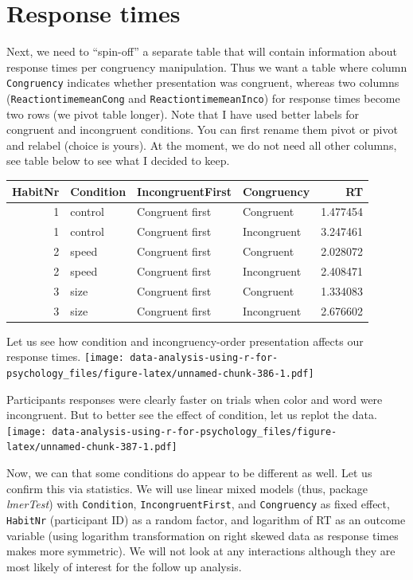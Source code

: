 \documentclass[
]{book}
\begin{document}
\hypertarget{response-times}{%
\section{Response times}\label{response-times}}

Next, we need to ``spin-off'' a separate table that will contain information about response times per congruency manipulation. Thus we want a table where column \texttt{Congruency} indicates whether presentation was congruent, whereas two columns (\texttt{ReactiontimemeanCong} and \texttt{ReactiontimemeanInco}) for response times become two rows (we pivot table longer). Note that I have used better labels for congruent and incongruent conditions. You can first rename them pivot or pivot and relabel (choice is yours). At the moment, we do not need all other columns, see table below to see what I decided to keep.

\begin{tabular}{r|l|l|l|r}
\hline
HabitNr & Condition & IncongruentFirst & Congruency & RT\\
\hline
1 & control & Congruent first & Congruent & 1.477454\\
\hline
1 & control & Congruent first & Incongruent & 3.247461\\
\hline
2 & speed & Congruent first & Congruent & 2.028072\\
\hline
2 & speed & Congruent first & Incongruent & 2.408471\\
\hline
3 & size & Congruent first & Congruent & 1.334083\\
\hline
3 & size & Congruent first & Incongruent & 2.676602\\
\hline
\end{tabular}

Let us see how condition and incongruency-order presentation affects our response times.
\texttt{[image: data-analysis-using-r-for-psychology\_files/figure-latex/unnamed-chunk-386-1.pdf]}

Participants responses were clearly faster on trials when color and word were incongruent. But to better see the effect of condition, let us replot the data.
\texttt{[image: data-analysis-using-r-for-psychology\_files/figure-latex/unnamed-chunk-387-1.pdf]}

Now, we can that some conditions do appear to be different as well. Let us confirm this via statistics. We will use linear mixed models (thus, package \emph{lmerTest}) with \texttt{Condition}, \texttt{IncongruentFirst}, and \texttt{Congruency} as fixed effect, \texttt{HabitNr} (participant ID) as a random factor, and logarithm of RT as an outcome variable (using logarithm transformation on right skewed data as response times makes more symmetric). We will not look at any interactions although they are most likely of interest for the follow up analysis.
\end{document}
